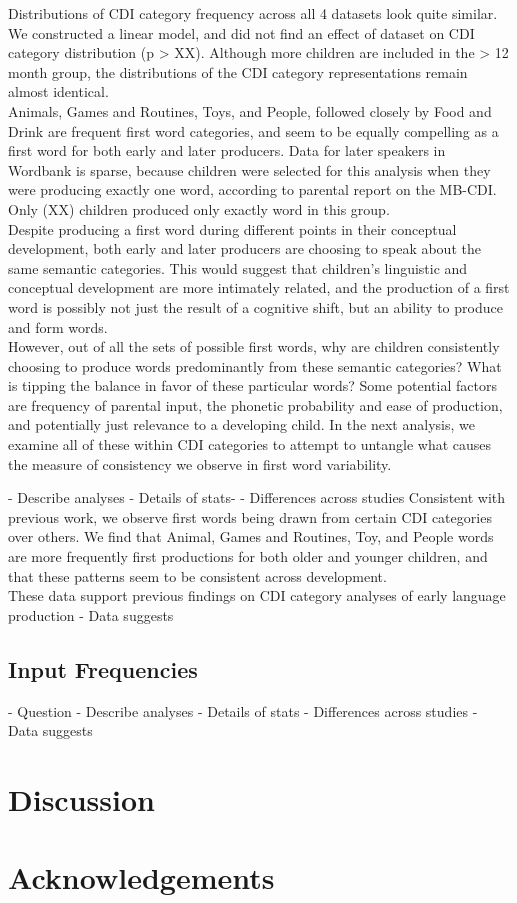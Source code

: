 \documentclass[10pt,letterpaper]{article}
\begin{document}
Distributions of CDI category frequency across all 4 datasets look quite similar. We constructed a linear model, and did not find an effect of dataset on CDI category distribution (p > XX). Although more children are included in the > 12 month group, the distributions of the CDI category representations remain almost identical. \\
Animals, Games and Routines, Toys, and People, followed closely by Food and Drink are frequent first word categories, and seem to be equally compelling as a first word for both early and later producers. Data for later speakers in Wordbank is sparse, because children were selected for this analysis when they were producing exactly one word, according to parental report on the MB-CDI. Only (XX) children produced only exactly word in this group. \\
Despite producing a first word during different points in their conceptual development, both early and later producers are choosing to speak about the same semantic categories. This would suggest that children's linguistic and conceptual development are more intimately related, and the production of a first word is possibly not just the result of a cognitive shift, but an ability to produce and form words. \\
However, out of all the sets of possible first words, why are children consistently choosing to produce words predominantly from these semantic categories? What is tipping the balance in favor of these particular words? Some potential factors are frequency of parental input, the phonetic probability and ease of production, and potentially just relevance to a developing child. In the next analysis, we examine all of these within CDI categories to attempt to untangle what causes the measure of consistency we observe in first word variability.


- Describe analyses
- Details of stats- 
- Differences across studies
Consistent with previous work, we observe first words being drawn from certain CDI categories over others. We find that Animal, Games and Routines, Toy, and People words are more frequently first productions for both older and younger children, and that these patterns seem to be consistent across development. \\
These data support previous findings on CDI category analyses of early language production 
- Data suggests

\subsection{Input Frequencies}
- Question
- Describe analyses
- Details of stats
- Differences across studies
- Data suggests

\section{Discussion}

\section{Acknowledgements}
\end{document}

